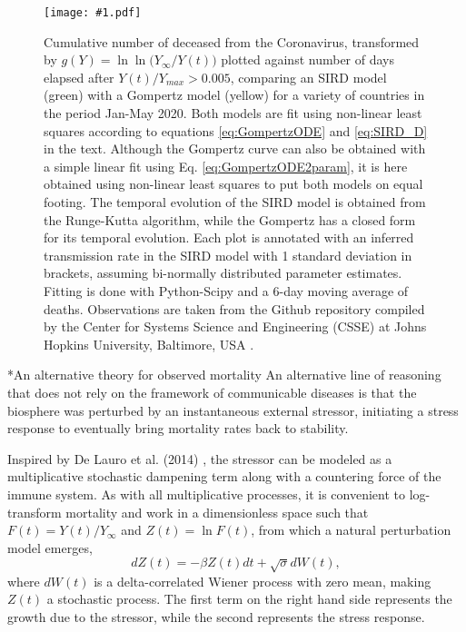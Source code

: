\documentclass{article}
\newcommand{\insertPdfFig}[3]{
  \begin{figure}[H]
  \centering
  \texttt{[image: \#1.pdf]}
  \caption{#2}
  \label{fig:#1}
  \end{figure}
}
\begin{document}
\insertPdfFig{Gompertz_vs_SIRD_lnln_infty}{Cumulative number of deceased from the Coronavirus, transformed by $g(Y)=\ln{\ln{({Y_{\infty} / Y(t))}}}$ plotted against number of days elapsed after $Y(t) / Y_{max}>0.005$, comparing an SIRD model (green) with a Gompertz model (yellow) for a variety of countries in the period Jan-May 2020. Both models are fit using non-linear least squares according to equations \ref{eq:GompertzODE} and \ref{eq:SIRD_D} in the text. Although the Gompertz curve can also be obtained with a simple linear fit using Eq. \ref{eq:GompertzODE2param}, it is here obtained using non-linear least squares to put both models on equal footing. The temporal evolution of the SIRD model is obtained from the Runge-Kutta algorithm, while the Gompertz has a closed form for its temporal evolution. Each plot is annotated with an inferred transmission rate in the SIRD model with 1 standard deviation in brackets, assuming bi-normally distributed parameter estimates. Fitting is done with Python-Scipy and a 6-day moving average of deaths. Observations are taken from the Github repository compiled by the Center for Systems Science and Engineering (CSSE) at Johns Hopkins University, Baltimore, USA \cite{dong2020interactive}.} 

\section*{An alternative theory for observed mortality}
\label{seq:alt}
An alternative line of reasoning that does not rely on the framework of communicable diseases is that the biosphere was perturbed by an instantaneous external stressor, initiating a stress response to eventually bring mortality rates back to stability.

Inspired by De Lauro et al. (2014) \cite{de2014stochastic}, the stressor can be modeled as a multiplicative stochastic dampening term along with a countering force of the immune system. 
As with all multiplicative processes, it is convenient to log-transform mortality and work in a dimensionless space such that $F(t)=Y(t)/Y_\infty$ and $Z(t)=\ln{F}(t)$, from which a natural perturbation model emerges,
\begin{equation}
\label{eq:microscopic}
dZ(t)= -\beta Z(t) dt + \sqrt{\sigma}dW(t),
\end{equation}
where $dW(t)$ is a delta-correlated Wiener process with zero mean, making $Z(t)$ a stochastic process. The first term on the right hand side represents the growth due to the stressor, while the second represents the stress response.  
\end{document}
